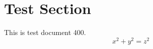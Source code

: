 \documentclass{article}
\begin{document}
\section{Test Section}
This is test document 400.
\begin{equation}
x^2 + y^2 = z^2
\end{equation}
\end{document}
